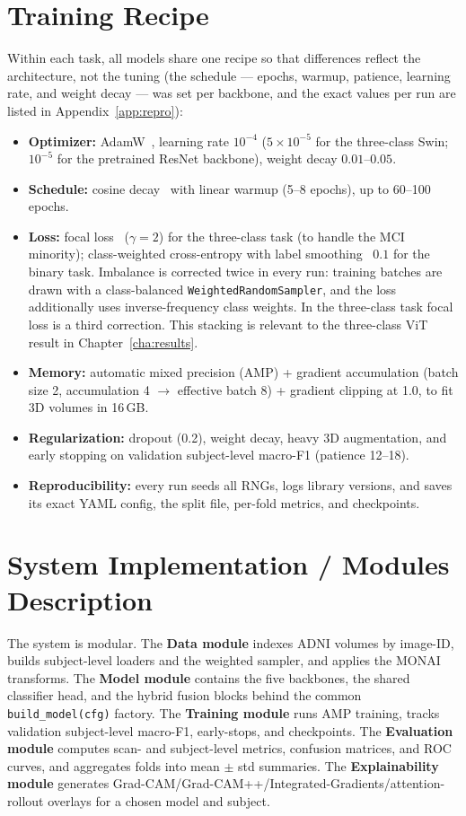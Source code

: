\section{Training Recipe}
Within each task, all models share one recipe so that differences reflect the architecture, not the tuning (the schedule --- epochs, warmup, patience, learning rate, and weight decay --- was set per backbone, and the exact values per run are listed in Appendix~\ref{app:repro}):
\begin{itemize}
    \item \textbf{Optimizer:} AdamW~\cite{loshchilov2019decoupled}, learning rate $10^{-4}$ ($5\times10^{-5}$ for the three-class Swin; $10^{-5}$ for the pretrained ResNet backbone), weight decay $0.01$--$0.05$.
    \item \textbf{Schedule:} cosine decay~\cite{loshchilov2017sgdr} with linear warmup (5--8 epochs), up to 60--100 epochs.
    \item \textbf{Loss:} focal loss~\cite{lin2017focal} ($\gamma=2$) for the three-class task (to handle the MCI minority); class-weighted cross-entropy with label smoothing~\cite{muller2019does} $0.1$ for the binary task. Imbalance is corrected twice in every run: training batches are drawn with a class-balanced \texttt{WeightedRandomSampler}, and the loss additionally uses inverse-frequency class weights. In the three-class task focal loss is a third correction. This stacking is relevant to the three-class ViT result in Chapter~\ref{cha:results}.
    \item \textbf{Memory:} automatic mixed precision (AMP) + gradient accumulation (batch size 2, accumulation 4 $\rightarrow$ effective batch 8) + gradient clipping at 1.0, to fit 3D volumes in 16\,GB.
    \item \textbf{Regularization:} dropout (0.2), weight decay, heavy 3D augmentation, and early stopping on validation subject-level macro-F1 (patience 12--18).
    \item \textbf{Reproducibility:} every run seeds all RNGs, logs library versions, and saves its exact YAML config, the split file, per-fold metrics, and checkpoints.
\end{itemize}

\section{System Implementation / Modules Description}
The system is modular. The \textbf{Data module} indexes ADNI volumes by image-ID, builds subject-level loaders and the weighted sampler, and applies the MONAI transforms. The \textbf{Model module} contains the five backbones, the shared classifier head, and the hybrid fusion blocks behind the common \texttt{build\_model(cfg)} factory. The \textbf{Training module} runs AMP training, tracks validation subject-level macro-F1, early-stops, and checkpoints. The \textbf{Evaluation module} computes scan- and subject-level metrics, confusion matrices, and ROC curves, and aggregates folds into mean $\pm$ std summaries. The \textbf{Explainability module} generates Grad-CAM/Grad-CAM++/Integrated-Gradients/attention-rollout overlays for a chosen model and subject.

